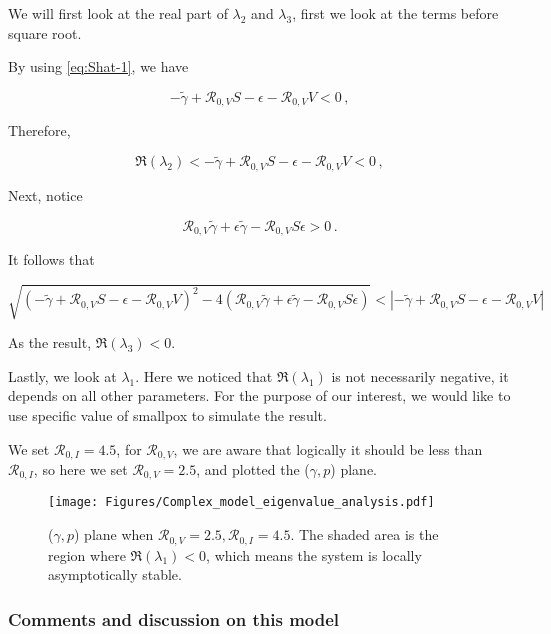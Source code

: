 \documentclass[12pt]{article}
\newcommand{\R}{\mathcal{R}}
\begin{document}
We will first look at the real part of $\lambda_2$ and $\lambda_3$, first we look at the terms before square root. 

By using \autoref{eq:Shat-1}, we have
\begin{linenomath*}
\begin{equation}
-\tilde{\gamma}+\R_{0,V}S-\epsilon-\R_{0,V}V<0\,,
\end{equation}
\end{linenomath*}

Therefore,
\begin{linenomath*}
\begin{equation}
\Re(\lambda_2)<-\tilde{\gamma}+\R_{0,V}S-\epsilon-\R_{0,V}V<0\,,
\end{equation}
\end{linenomath*}

Next, notice
\begin{linenomath*}
\begin{equation}
\R_{0,V}\tilde{\gamma}+\epsilon\tilde{\gamma}-\R_{0,V}S\epsilon>0\,.
\end{equation}
\end{linenomath*}
It follows that
\begin{linenomath*}
\begin{equation}
\sqrt{(-\tilde{\gamma}+\R_{0,V} S-\epsilon-\R_{0,V}V)^2-4(\R_{0,V}\tilde{\gamma}+\epsilon\tilde{\gamma}-\R_{0,V}S\epsilon)}<|-\tilde{\gamma}+\R_{0,V} S-\epsilon-\R_{0,V}V|
\end{equation}
\end{linenomath*}
As the result, $\Re(\lambda_3)<0$.

Lastly, we look at $\lambda_1$. Here we noticed that $\Re(\lambda_1)$ is not necessarily negative, it depends on all other parameters. For the purpose of our interest, we would like to use specific value of smallpox to simulate the result.

We set $\R_{0,I}=4.5$, for $\R_{0,V}$, we are aware that logically it should be less than $\R_{0,I}$, so here we set $\R_{0,V}=2.5$, and plotted the ($\gamma,p$) plane.

\begin{figure}[H]
  \centering
  \texttt{[image: Figures/Complex\_model\_eigenvalue\_analysis.pdf]}
  \caption{($\gamma,p$) plane when $\R_{0,V}=2.5, \R_{0,I}=4.5$. The shaded area is the region where $\Re(\lambda_1)<0$, which means the system is locally asymptotically stable.}
\end{figure}

\subsubsection{Comments and discussion on this model}
\end{document}
